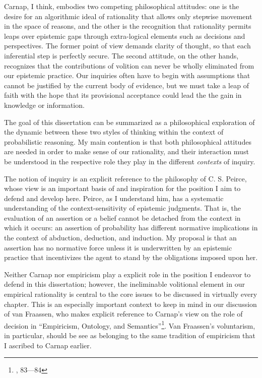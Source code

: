 Carnap, I think, embodies two competing philosophical attitudes: one is
the desire for an algorithmic ideal of rationality that allows only  stepwise movement in the space of reasons, and the other is the
recognition that rationality permits leaps over epistemic gaps through extra-logical elements such as decisions and perspectives. The former point of
view demands clarity of thought, so that each inferential step is
perfectly secure. The second attitude, on the other hands, recognizes that the contributions of volition can never be wholly eliminated from our epistemic practice. Our inquiries often have to begin with assumptions that cannot be justified by the current body of evidence, but we must take a leap of faith with the hope that its provisional acceptance could lead the the gain in knowledge or information.

The goal of this dissertation can be summarized as a philosophical
exploration of the dynamic between these two styles of thinking within
the context of probabilistic reasoning. My main contention is that both
philosophical attitudes are needed in order to make sense of our rationality, and
their interaction must be understood in the respective role they play in
the different \emph{contexts} of inquiry.

The notion of inquiry is an explicit reference to the philosophy of C.
S. Peirce, whose view is an important basis of and inspiration for the
position I aim to defend and develop here. Peirce, as I understand him,
has a systematic understanding of the context-sensitivity of epistemic
judgments. That is, the evaluation of an assertion or a belief cannot be
detached from the context in which it occurs: an assertion of
probability has different normative implications in the context of
abduction, deduction, and induction. My proposal is that an
assertion has no normative force unless it is underwritten by an
epistemic practice that incentivizes the agent to stand by the
obligations imposed upon her.

Neither Carnap nor empiricism play a explicit role in the position I endeavor to defend in this dissertation; however, the ineliminable volitional element in our empirical rationality is central to the core issues to be discussed in virtually every chapter. This is an especially important context to keep in mind in our discussion of van Fraassen, who makes explicit reference to Carnap's view on the role of decision in ``Empiricism, Ontology, and Semantics''\footnote{\cite{antinatural}, 83---84}. Van Fraassen's voluntarism, in particular, should be see as belonging to the same tradition of empiricism that I ascribed to Carnap earlier.




